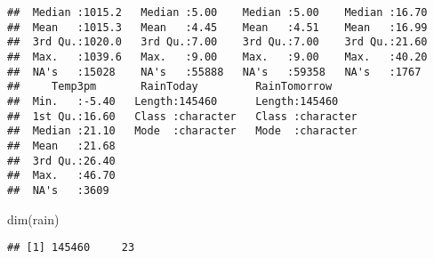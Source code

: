 \documentclass[
]{article}
\newenvironment{Shaded}{\begin{snugshade}}{\end{snugshade}}
\newcommand{\FunctionTok}[1]{\textcolor[rgb]{0.00,0.00,0.00}{#1}}
\newcommand{\NormalTok}[1]{#1}
\begin{document}
\begin{verbatim}
##  Median :1015.2   Median :5.00    Median :5.00    Median :16.70  
##  Mean   :1015.3   Mean   :4.45    Mean   :4.51    Mean   :16.99  
##  3rd Qu.:1020.0   3rd Qu.:7.00    3rd Qu.:7.00    3rd Qu.:21.60  
##  Max.   :1039.6   Max.   :9.00    Max.   :9.00    Max.   :40.20  
##  NA's   :15028    NA's   :55888   NA's   :59358   NA's   :1767   
##     Temp3pm       RainToday         RainTomorrow      
##  Min.   :-5.40   Length:145460      Length:145460     
##  1st Qu.:16.60   Class :character   Class :character  
##  Median :21.10   Mode  :character   Mode  :character  
##  Mean   :21.68                                        
##  3rd Qu.:26.40                                        
##  Max.   :46.70                                        
##  NA's   :3609
\end{verbatim}

\begin{Shaded}
\begin{Highlighting}[]
\FunctionTok{dim}\NormalTok{(rain)}
\end{Highlighting}
\end{Shaded}

\begin{verbatim}
## [1] 145460     23
\end{verbatim}
\end{document}
